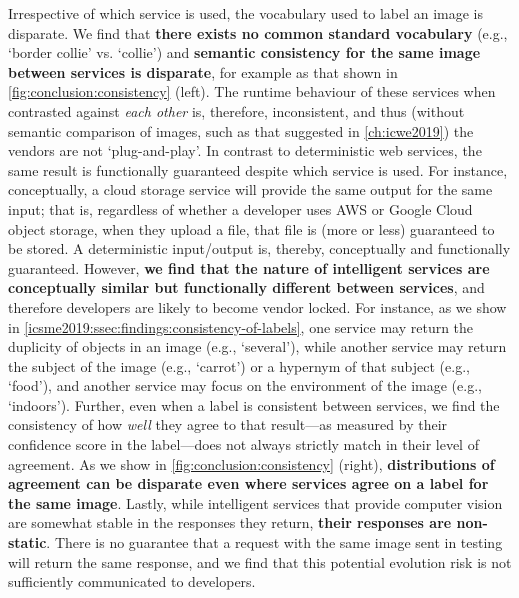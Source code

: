 Irrespective of which service is used, the vocabulary used to label an image is disparate. We find that \textbf{there exists no common standard vocabulary} (e.g., `border collie' vs. `collie') and \textbf{semantic consistency for the same image between services is disparate}, for example as that shown in \cref{fig:conclusion:consistency} (left). The runtime behaviour of these services when contrasted against \textit{each other} is, therefore, inconsistent, and thus (without semantic comparison of images, such as that suggested in \cref{ch:icwe2019}) the vendors are not `plug-and-play'. In contrast to deterministic web services, the same result is functionally guaranteed despite which service is used. For instance, conceptually, a cloud storage service will provide the same output for the same input; that is, regardless of whether a developer uses AWS or Google Cloud object storage, when they upload a file, that file is (more or less) guaranteed to be stored. A deterministic input/output is, thereby, conceptually and functionally guaranteed. However, \textbf{we find that the nature of intelligent services are conceptually similar but functionally different between services}, and therefore developers are likely to become vendor locked. For instance, as we show in \cref{icsme2019:ssec:findings:consistency-of-labels}, one service may return the duplicity of objects in an image (e.g., `several'), while another service may return the subject of the image (e.g., `carrot') or a hypernym of that subject (e.g., `food'), and another service may focus on the environment of the image (e.g., `indoors').
Further, even when a label is consistent between services, we find the consistency of how \textit{well} they agree to that result---as measured by their confidence score in the label---does not always strictly match in their level of agreement. As we show in \cref{fig:conclusion:consistency} (right), \textbf{distributions of agreement can be disparate even where services agree on a label for the same image}.
Lastly, while intelligent services that provide computer vision are somewhat stable in the responses they return, \textbf{their responses are non-static}. There is no guarantee that a request with the same image sent in testing will return the same response, and we find that this potential evolution risk is not sufficiently communicated to developers.

